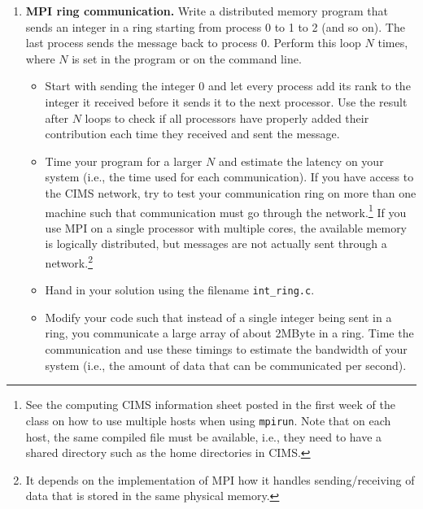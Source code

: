 \documentclass[12pt]{article}
\begin{document}
\begin{enumerate}

\item {\bf MPI ring communication.}  Write a distributed memory
  program that sends an integer in a ring starting from process 0 to 1
  to 2 (and so on). The last process sends the message back to process
  0. Perform this loop $N$ times, where $N$ is set in the program or
  on the command line.
  \begin{itemize}
  \item Start with sending the integer 0 and let every process add its
    rank to the integer it received before it sends it to the next
    processor. Use the result
    after $N$ loops to check if all processors have properly added
    their contribution each time they received and sent the message.
  \item Time your program for a larger $N$ and estimate the latency on
    your system (i.e., the time used for each communication).  If you
    have access to the CIMS network, try to test your communication
    ring on more than one machine such that communication must go
    through the network.\footnote{See the computing \@ CIMS
      information sheet posted in the first week of the class
      on how to use multiple hosts when using \texttt{mpirun}. Note
      that on each host, the same compiled file must be available,
      i.e., they need to have a shared directory such as the home
      directories in CIMS.} If you
    use MPI on a single processor with multiple cores, the available
    memory is logically distributed, but messages are not actually
    sent through a network.\footnote{It depends on the implementation
      of MPI how it handles sending/receiving of data that is stored
      in the same physical memory.}
  \item Hand in your solution using the filename \texttt{int\_ring.c}.
  \item Modify your code such that instead of a single integer being
    sent in a ring, you communicate a large array of about 2MByte in a
    ring. Time the communication and use these timings to estimate the
    bandwidth of your system (i.e., the amount of data that can be
    communicated per second).
  \end{itemize}



\end{enumerate}
\end{document}
